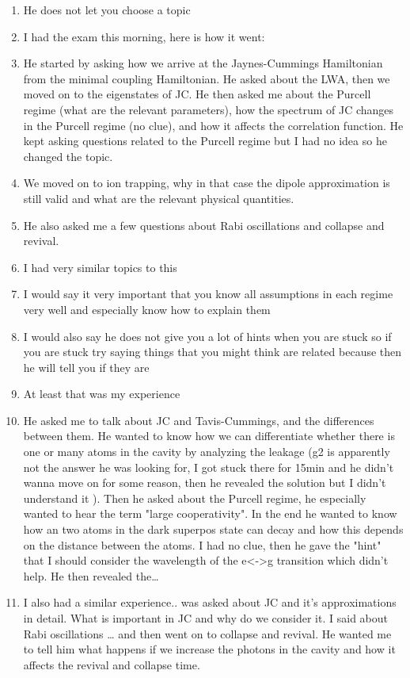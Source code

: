 \documentclass{article}%
\begin{document}
%
\normalsize%
\begin{enumerate}%
\item%
He does not let you choose a topic%
\item%
I had the exam this morning, here is how it went:%
\item%
He started by asking how we arrive at the Jaynes{-}Cummings Hamiltonian from the minimal coupling Hamiltonian. He asked about the LWA, then we moved on to the eigenstates of JC. He then asked me about the Purcell regime (what are the relevant parameters), how the spectrum of JC changes in the Purcell regime (no clue), and how it affects the correlation function. He kept asking questions related to the Purcell regime but I had no idea so he changed the topic. %
\item%
We moved on to ion trapping, why in that case the dipole approximation is still valid and what are the relevant physical quantities. %
\item%
He also asked me a few questions about Rabi oscillations and collapse and revival.%
\item%
I had very similar topics to this%
\item%
I would say it very important that you know all assumptions in each regime very well and especially know how to explain them%
\item%
I would also say he does not give you a lot of hints when you are stuck so if you are stuck try saying things that you might think are related because then he will tell you if they are%
\item%
At least that was my experience%
\item%
He asked me to talk about JC and Tavis{-}Cummings, and the differences between them. He wanted to know how we can differentiate whether there is one or many atoms in the cavity by analyzing the leakage (g2 is apparently not the answer he was looking for, I got stuck there for 15min and he didn't wanna move on for some reason, then he revealed the solution but I didn't understand it ). Then he asked about the Purcell regime, he especially wanted to hear the term "large cooperativity". In the end he wanted to know how an two atoms in the dark superpos state can decay and how this depends on the distance between the atoms. I had no clue, then he gave the "hint" that I should consider the wavelength of the e<{-}>g transition which didn't help. He then revealed the…%
\item%
I also had a similar experience.. was asked about JC and it’s approximations in detail. What is important in JC and why do we consider it. I said about Rabi oscillations … and then went on to collapse and revival. He wanted me to tell him what happens if we increase the photons in the cavity and how it affects the revival and collapse time. %

\end{enumerate}
\end{document}
